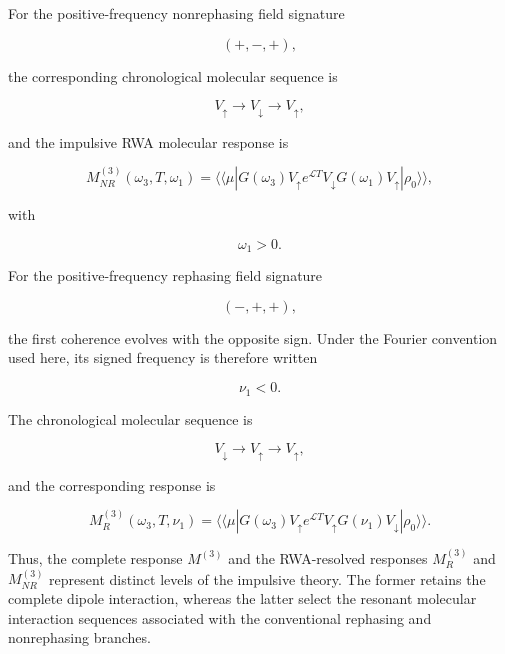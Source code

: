 \documentclass[11pt]{article}
\begin{document}
For the positive-frequency nonrephasing field signature

\begin{equation}
(+,-,+),
\end{equation}

the corresponding chronological molecular sequence is

\begin{equation}
V_{\uparrow}
\rightarrow
V_{\downarrow}
\rightarrow
V_{\uparrow},
\end{equation}

and the impulsive RWA molecular response is

\begin{equation}
\boxed{
M_{NR}^{(3)}
(\omega_3,T,\omega_1)
=
\langle\!\langle\mu|
G(\omega_3)
V_{\uparrow}
e^{\mathcal{L}T}
V_{\downarrow}
G(\omega_1)
V_{\uparrow}
|\rho_0\rangle\rangle,
}
\label{eq:impulsive_NR_response}
\end{equation}

with

\begin{equation}
\omega_1>0.
\end{equation}

For the positive-frequency rephasing field signature

\begin{equation}
(-,+,+),
\end{equation}

the first coherence evolves with the opposite sign. Under the Fourier
convention used here, its signed frequency is therefore written

\begin{equation}
\nu_1<0.
\end{equation}

The chronological molecular sequence is

\begin{equation}
V_{\downarrow}
\rightarrow
V_{\uparrow}
\rightarrow
V_{\uparrow},
\end{equation}

and the corresponding response is

\begin{equation}
\boxed{
M_{R}^{(3)}
(\omega_3,T,\nu_1)
=
\langle\!\langle\mu|
G(\omega_3)
V_{\uparrow}
e^{\mathcal{L}T}
V_{\uparrow}
G(\nu_1)
V_{\downarrow}
|\rho_0\rangle\rangle.
}
\label{eq:impulsive_R_response}
\end{equation}

Thus, the complete response $M^{(3)}$ and the RWA-resolved responses
$M_R^{(3)}$ and $M_{NR}^{(3)}$ represent distinct levels of the
impulsive theory. The former retains the complete dipole interaction,
whereas the latter select the resonant molecular interaction sequences
associated with the conventional rephasing and nonrephasing branches.
\end{document}
